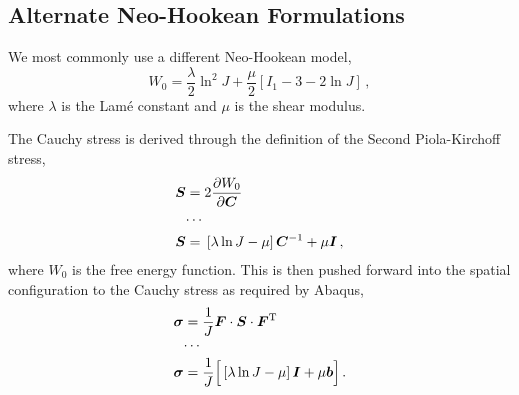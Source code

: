 \documentclass[10pt,letterpaper,oneside]{report}
\newcommand{\ten}[1]{\mbox{\boldmath $#1$}{}}
\newcommand{\scas}[1]{\mbox{{\scriptsize{${\rm{#1}}$}}}{}}
\begin{document}
\begin{itemize}
\subsection{Alternate Neo-Hookean Formulations}
We most commonly use a different Neo-Hookean model, 
\begin{equation}
W_0 = \frac{\lambda}{2} \ln^2 J + \frac{\mu}{2} \left[ I_1 - 3 - 2 \ln J \right] \, ,
\end{equation}
where $\lambda$ is the Lamé constant and $\mu$ is the shear modulus.

The Cauchy stress is derived through the definition of the Second Piola-Kirchoff stress,
\begin{align}
\ten{S} ={}& 2 \frac{\partial W_0}{\partial \ten{C}}  
\\
\cdots{}& \notag \\
\ten{S} ={}& \left[ \lambda \ln J - \mu \right] \ten{C}^{-1} + \mu \ten{I} \, , 
\end{align}
where $W_0$ is the free energy function.  This is then pushed forward into the spatial configuration to the Cauchy stress as required by Abaqus, 
\begin{align}
\ten{\sigma} ={}& \frac{1}{J} \ten{F} \cdot \ten{S} \cdot \ten{F}^{\scas{T}} 
\\
\cdots{}& \notag \\
\ten{\sigma} ={}& \frac{1}{J} \Big[ \left[ \lambda \ln J - \mu \right] \ten{I} + \mu \ten{b} \Big] \, . 
\end{align}


\end{itemize}
\end{document}

